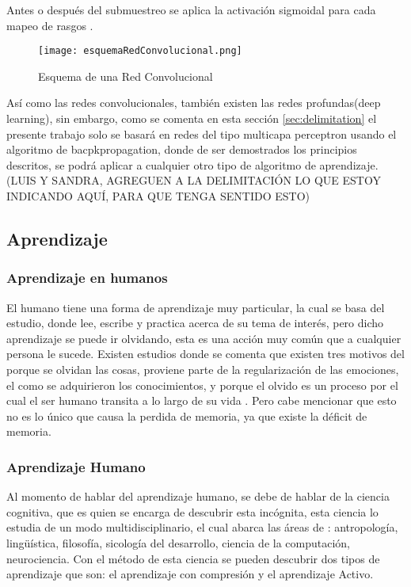             Antes o despu\'es del submuestreo se aplica la activaci\'on sigmoidal para cada mapeo de rasgos \cite{duran2017}.

            \begin{figure}[H]
                \centering
                \texttt{[image: esquemaRedConvolucional.png]}
                \caption{Esquema de una Red Convolucional \cite{duran2017}}
                \label{fig:fig7}
            \end{figure}

Así como las redes convolucionales, también existen las redes profundas(deep learning), sin embargo, como se comenta en esta sección \ref{sec:delimitation} el presente trabajo solo se basará en redes del tipo multicapa perceptron usando el algoritmo de bacpkpropagation, donde de ser demostrados los principios descritos, se podrá aplicar a cualquier otro tipo de algoritmo de aprendizaje.  (LUIS Y SANDRA, AGREGUEN A LA DELIMITACIÓN LO QUE ESTOY INDICANDO AQUÍ, PARA QUE TENGA SENTIDO ESTO)



\subsection{Aprendizaje}

\subsubsection{Aprendizaje en humanos}
        El humano tiene una forma de aprendizaje muy particular, la cual se basa del estudio, donde lee, escribe y practica acerca de
        su tema de interés, pero dicho aprendizaje se puede ir olvidando, esta es una acción muy común que a cualquier persona le sucede.
        Existen estudios donde se comenta que existen tres motivos del porque se olvidan las cosas, proviene parte de la regularización de las emociones,
        el como se adquirieron los conocimientos, y porque el olvido es un proceso por el cual el ser humano transita a lo largo de su vida \cite{Nrby2015}. Pero cabe
        mencionar que esto no es lo único que causa la perdida de memoria, ya que existe la déficit de memoria. 

    \subsubsection{Aprendizaje Humano}
        Al momento de hablar del aprendizaje humano, se debe de hablar de la ciencia cognitiva, que es quien se encarga de descubrir esta incógnita,
        esta ciencia lo estudia de un modo multidisciplinario, el cual abarca las \'areas de \cite{bransford2000}: antropología, lingüística, 
        filosofía, sicología del desarrollo, ciencia de la computación, neurociencia.
        Con el método de esta ciencia se pueden descubrir dos tipos de aprendizaje que son: el aprendizaje con compresi\'on y el aprendizaje Activo.
        
